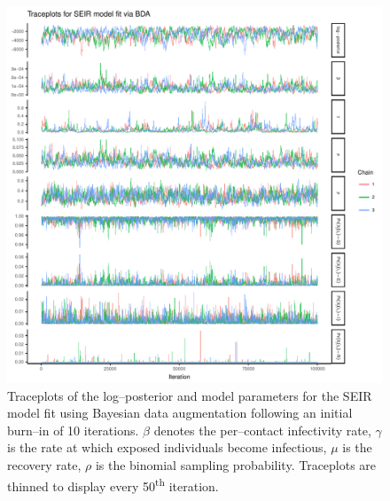 \begin{figure}[htbp]
	\centering
	\includegraphics[width=0.9\linewidth]{figures/seir_bda_traceplots}
	\caption[Simulation 1 MCMC traceplots for an SEIR model fit using Bayesian data augmentation.]{Traceplots of the log--posterior and model parameters for the SEIR model fit using Bayesian data augmentation following an initial burn--in of 10 iterations. $ \beta $ denotes the per--contact infectivity rate, $ \gamma $ is the rate at which exposed individuals become infectious, $ \mu $ is the recovery rate, $ \rho $ is the binomial sampling probability. Traceplots are thinned to display every 50\textsuperscript{th} iteration.}
	\label{fig:seirbdatraceplots}
\end{figure}

